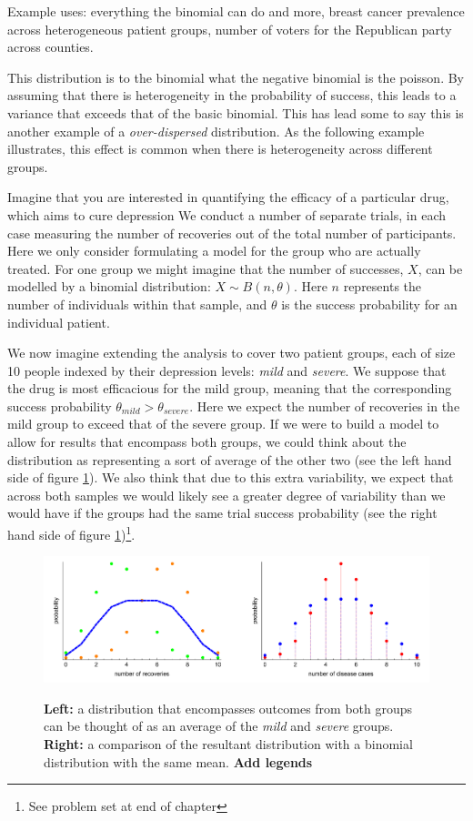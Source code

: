 \documentclass[11pt,fullpage]{book}
\begin{document}
Example uses: everything the binomial can do and more, breast cancer prevalence across heterogeneous patient groups, number of voters for the Republican party across counties.

This distribution is to the binomial what the negative binomial is the poisson. By assuming that there is heterogeneity in the probability of success, this leads to a variance that exceeds that of the basic binomial. This has lead some to say this is another example of a \textit{over-dispersed} distribution. As the following example illustrates, this effect is common when there is heterogeneity across different groups. 

Imagine that you are interested in quantifying the efficacy of a particular drug, which aims to cure depression We conduct a number of separate trials, in each case measuring the number of recoveries out of the total number of participants. Here we only consider formulating a model for the group who are actually treated. For one group we might imagine that the number of successes, $X$, can be modelled by a binomial distribution: $X\sim B(n,\theta)$. Here $n$ represents the number of individuals within that sample, and $\theta$ is the success probability for an individual patient.

We now imagine extending the analysis to cover two patient groups, each of size 10 people indexed by their depression levels: \textit{mild} and \textit{severe}. We suppose that the drug is most efficacious for the mild group, meaning that the corresponding success probability $\theta_{mild}> \theta_{severe}$. Here we expect the number of recoveries in the mild group to exceed that of the severe group. If we were to build a model to allow for results that encompass both groups, we could think about the distribution as representing a sort of average of the other two (see the left hand side of figure \ref{fig:Distributions_betaBinomialDispersion}). We also think that due to this extra variability, we expect that across both samples we would likely see a greater degree of variability than we would have if the groups had the same trial success probability (see the right hand side of figure \ref{fig:Distributions_betaBinomialDispersion})\footnote{See problem set at end of chapter}. 

\begin{figure}
\centering
\scalebox{0.5} 
{\includegraphics{Distributions_betaBinomialDispersion.pdf}}
\caption{\textbf{Left:} a distribution that encompasses outcomes from both groups can be thought of as an average of the \textit{mild} and \textit{severe} groups. \textbf{Right:} a comparison of the resultant distribution with a binomial distribution with the same mean. \textbf{Add legends}}\label{fig:Distributions_betaBinomialDispersion}
\end{figure} 
\end{document}
